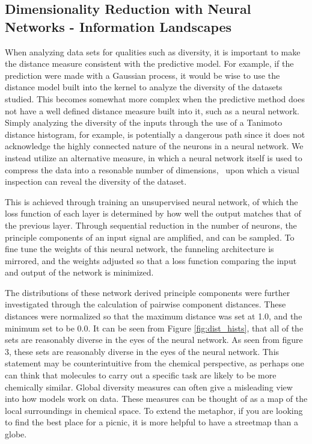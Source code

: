\subsection{Dimensionality Reduction with Neural Networks - Information Landscapes}

When analyzing data sets for qualities such as diversity, it is important to make the distance measure consistent with the predictive model.  For example, if the prediction were made with a Gaussian process, it would be wise to use the distance model built into the kernel to analyze the diversity of the datasets studied.  This becomes somewhat more complex when the predictive method does not have a well defined distance measure built into it, such as a neural network.  Simply analyzing the diversity of the inputs through the use of a Tanimoto distance histogram, for example, is potentially a dangerous path since it does not acknowledge the highly connected nature of the neurons in a neural network.  We instead utilize an alternative measure, in which a neural network itself is used to compress the data into a resonable number of dimensions,~\cite{hinton_reducing_2006} upon which a visual inspection can reveal the diversity of the dataset.

This is achieved through training an unsupervised neural network, of which the loss function of each layer is determined by how well the output matches that of the previous layer.  Through sequential reduction in the number of neurons, the principle components of an input signal are amplified, and can be sampled.  To fine tune the weights of this neural network, the funneling architecture is mirrored, and the weights adjusted so that a loss function comparing the input and output of the network is minimized.

The distributions of these network derived principle components were further investigated through the calculation of pairwise component distances. These distances were normalized so that the maximum distance was set at 1.0, and the minimum set to be 0.0. It can be seen from Figure \ref{fig:dist_hists}, that all of the sets are reasonably diverse in the eyes of the neural network.  As seen from figure 3, these sets are reasonably diverse in the eyes of the neural network. This statement may be counterintuitive from the chemical perspective, as perhaps one can think that molecules to carry out a specific task are likely to be more chemically similar. Global diversity measures can often give a misleading view into how models work on data. These measures can be thought of as a map of the local surroundings in chemical space.  To extend the metaphor, if you are looking to find the best place for a picnic, it is more helpful to have a streetmap than a globe.